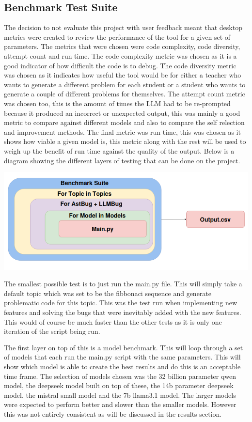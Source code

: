 \documentclass[12pt]{extarticle}
\begin{document}
\subsection{Benchmark Test Suite}

The decision to not evaluate this project with user feedback meant that desktop metrics were created to review the performance of the tool for a given set of parameters. The metrics that were chosen were code complexity, code diversity, attempt count and run time. The code complexity metric was chosen as it is a good indicator of how difficult the code is to debug. The code diversity metric was chosen as it indicates how useful the tool would be for either a teacher who wants to generate a different problem for each student or a student who wants to generate a couple of different problems for themselves. The attempt count metric was chosen too, this is the amount of times the LLM had to be re-prompted because it produced an incorrect or unexpected output, this was mainly a good metric to compare against different models and also to compare the self relection and improvement methods. The final metric was run time, this was chosen as it shows how viable a given model is, this metric along with the rest will be used to weigh up the benefit of run time against the quality of the output. Below is a diagram showing the different layers of testing that can be done on the project.

\includegraphics[width=\linewidth]{Images/Benchmark.png}

The smallest possible test is to just run the main.py file. This will simply take a default topic which was set to be the fibbonaci sequence and generate problematic code for this topic. This was the test run when implementing new features and solving the bugs that were inevitably added with the new features. This would of course be much faster than the other tests as it is only one iteration of the script being run.

The first layer on top of this is a model benchmark. This will loop through a set of models that each run the main.py script with the same parameters. This will show which model is able to create the best results and do this is an acceptable time frame. The selection of models chosen was the 32 billion parameter qwen model, the deepseek model built on top of these, the 14b parameter deepseek model, the mistral small model and the 7b llama3.1 model. The larger models were expected to perform better and slower than the smaller models. However this was not entirely consistent as will be discussed in the results section.
\end{document}
